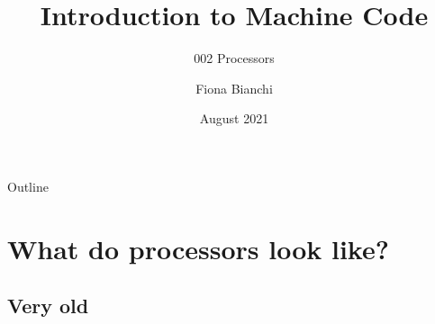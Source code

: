 \documentclass{beamer}
\title{Introduction to Machine Code}
\subtitle{002 Processors}
\author{Fiona Bianchi}
\institute{HiKlas Ltd}
\date{August 2021}
\begin{document}
\begin{frame}
  \titlepage
\end{frame}

\begin{frame}{Outline}
  \tableofcontents
\end{frame}

\section{What do processors look like?}

\subsection[Precursors]{Very old}
\end{document}
